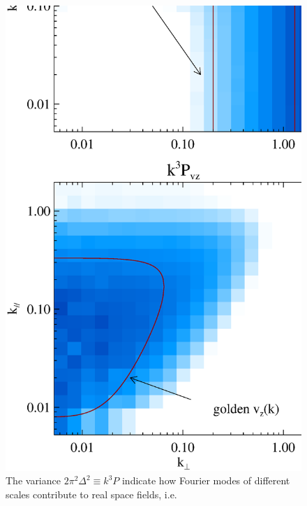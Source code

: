\begin{figure}[btp]
\captionsetup{width=0.28\linewidth,justification=raggedright}
\begin{minipage}[t]{0.33\linewidth}
\begin{center}
\includegraphics[width=\textwidth,height=1.7\textwidth]{figure/k3pd_k3pv_z1_note.eps}
\end{center}
\vspace{-0.7cm}
\caption{
       The variance $2\pi^2\Delta^2\equiv k^3P$ 
       indicate how Fourier modes of different scales 
       contribute to real space fields, i.e.
}
\end{minipage}
\end{figure}

